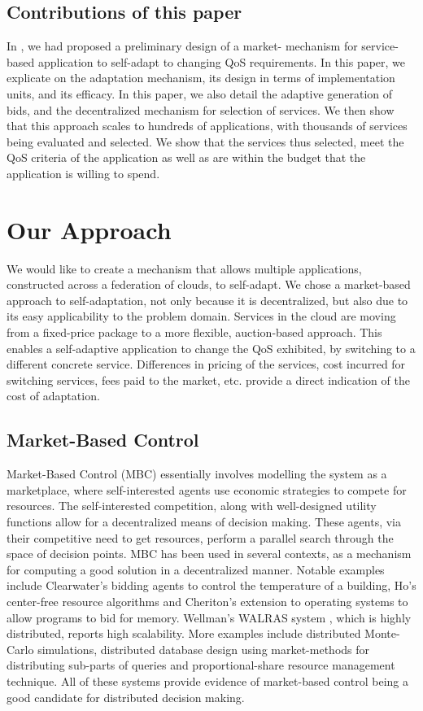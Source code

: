 \documentclass[10pt,journal,compsoc]{IEEEtran}
\begin{document}
\subsection{Contributions of this paper}
In \cite{Nallur2010Design}, we had proposed a preliminary design of a market- mechanism for service-based application to self-adapt to changing QoS requirements. In this paper, we explicate on the adaptation mechanism, its design in terms of implementation units, and its efficacy.  In this paper, we also detail the adaptive generation of bids, and the decentralized mechanism for selection of services. We then show that this approach scales to hundreds of applications, with thousands of services being evaluated and selected. We show that the services thus selected, meet the QoS criteria of the application as well as are within the budget that the application is willing to spend. 
  
\section{Our Approach}
We would like to create a mechanism that allows multiple applications, constructed across a federation of clouds, to self-adapt. We chose a market-based approach to self-adaptation, not only because it is decentralized, but also due to its easy applicability to the problem domain. Services in the cloud are moving from a fixed-price package to a more flexible, auction-based approach\cite{Amazon2010SpotInstance}. This enables a self-adaptive application to change the QoS exhibited, by switching to a different concrete service. Differences in pricing of the services, cost incurred for switching services, fees paid to the market, etc. provide a direct indication of the cost of adaptation. 
\subsection{Market-Based Control}
Market-Based Control (MBC) essentially involves modelling the system as a marketplace, where self-interested agents use economic strategies to compete for resources. The self-interested competition, along with well-designed utility functions allow for a decentralized means of decision making. These agents, via their competitive need to get resources, perform a parallel search through the space of decision points. MBC has been used in several contexts, as a mechanism for computing a good solution in a decentralized manner. Notable examples include Clearwater's bidding agents to control the temperature of a building\cite{Clearwater1996Saving}, Ho's center-free resource algorithms \cite{Ho1980class} and Cheriton's extension to operating systems to allow programs to bid for memory\cite{Harty1996market}. Wellman's WALRAS system \cite{Wellman1993market-oriented}, which is highly distributed, reports high scalability. More examples include distributed Monte-Carlo simulations\cite{Waldspurger1992Spawn}, distributed database design using market-methods for distributing sub-parts of queries \cite{Stonebraker1994Economic} and proportional-share resource management technique\cite{Waldspurger1994Lottery}. All of these systems provide evidence of market-based control being a good candidate for distributed decision making. 
\end{document}
